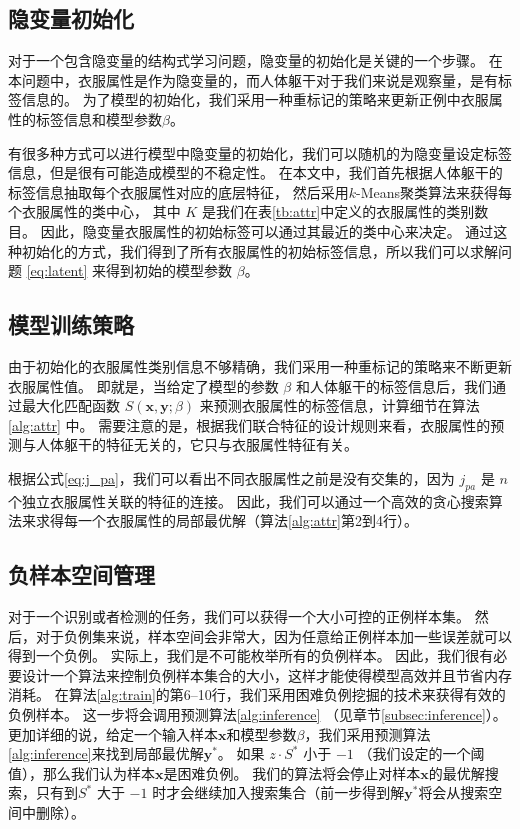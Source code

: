 \subsection{隐变量初始化}
对于一个包含隐变量的结构式学习问题，隐变量的初始化是关键的一个步骤。
在本问题中，衣服属性是作为隐变量的，而人体躯干对于我们来说是观察量，是有标签信息的。
为了模型的初始化，我们采用一种重标记的策略来更新正例中衣服属性的标签信息和模型参数$\beta$。

有很多种方式可以进行模型中隐变量的初始化，我们可以随机的为隐变量设定标签信息，但是很有可能造成模型的不稳定性。
在本文中，我们首先根据人体躯干的标签信息抽取每个衣服属性对应的底层特征，
然后采用$k$-Means聚类算法来获得每个衣服属性的类中心，
其中 $K$ 是我们在表\ref{tb:attr}中定义的衣服属性的类别数目。
因此，隐变量衣服属性的初始标签可以通过其最近的类中心来决定。
通过这种初始化的方式，我们得到了所有衣服属性的初始标签信息，所以我们可以求解问题 \eqref{eq:latent} 来得到初始的模型参数 $\beta$。

\subsection{模型训练策略}
由于初始化的衣服属性类别信息不够精确，我们采用一种重标记的策略来不断更新衣服属性值。
即就是，当给定了模型的参数 $\beta$ 和人体躯干的标签信息后，我们通过最大化匹配函数 $S(\mathbf{x}, \mathbf{y}; \beta)$ 来预测衣服属性的标签信息，计算细节在算法 \ref{alg:attr} 中。
需要注意的是，根据我们联合特征的设计规则来看，衣服属性的预测与人体躯干的特征无关的，它只与衣服属性特征有关。

根据公式\eqref{eq:j_pa}，我们可以看出不同衣服属性之前是没有交集的，因为 $j_{pa}$ 是 $n$ 个独立衣服属性关联的特征的连接。
因此，我们可以通过一个高效的贪心搜索算法来求得每一个衣服属性的局部最优解（算法\ref{alg:attr}第2到4行）。


\subsection{负样本空间管理}
对于一个识别或者检测的任务，我们可以获得一个大小可控的正例样本集。
然后，对于负例集来说，样本空间会非常大，因为任意给正例样本加一些误差就可以得到一个负例。
实际上，我们是不可能枚举所有的负例样本。
因此，我们很有必要设计一个算法来控制负例样本集合的大小，这样才能使得模型高效并且节省内存消耗。
在算法\ref{alg:train}的第6--10行，我们采用困难负例挖掘\cite{dpm}的技术来获得有效的负例样本。
这一步将会调用预测算法\ref{alg:inference} （见章节\ref{subsec:inference}）。
更加详细的说，给定一个输入样本$\mathbf{x}$和模型参数$\beta$，我们采用预测算法\ref{alg:inference}来找到局部最优解$\mathbf{y}^*$。
如果 $z \cdot S^*$ 小于 $-1$ （我们设定的一个阈值），那么我们认为样本$\mathbf{x}$是困难负例。
我们的算法将会停止对样本$\mathbf{x}$的最优解搜索，只有到$S^*$ 大于 $-1$ 时才会继续加入搜索集合（前一步得到解$\mathbf{y}^*$将会从搜索空间中删除）。

